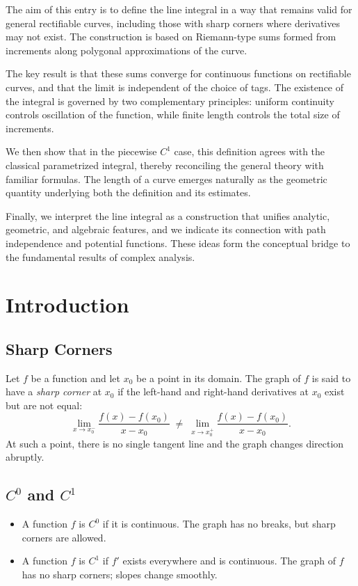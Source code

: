 \documentclass{article}
\begin{document}
The aim of this entry is to define the line integral in a way that remains valid for general rectifiable curves, including
those with sharp corners where derivatives may not exist. The construction is based on Riemann-type sums formed
from increments along polygonal approximations of the curve.

The key result is that these sums converge for continuous functions on rectifiable curves, and that the limit is independent
of the choice of tags. The existence of the integral is governed by two complementary principles: uniform continuity
controls oscillation of the function, while finite length controls the total size of increments.

We then show that in the piecewise \(C^1\) case, this definition agrees with the classical parametrized integral, thereby
reconciling the general theory with familiar formulas. The length of a curve emerges naturally as the geometric quantity
underlying both the definition and its estimates.

Finally, we interpret the line integral as a construction that unifies analytic, geometric, and algebraic features, and we
indicate its connection with path independence and potential functions. These ideas form the conceptual bridge to the
fundamental results of complex analysis.

\section{Introduction}

\subsection{Sharp Corners}
Let $f$ be a function and let $x_0$ be a point in its domain.
The graph of $f$ is said to have a \emph{sharp corner} at $x_0$ if the left-hand
and right-hand derivatives at $x_0$ exist but are not equal:
\[
\lim_{x\to x_0^-}\frac{f(x)-f(x_0)}{x-x_0}
\;\neq\;
\lim_{x\to x_0^+}\frac{f(x)-f(x_0)}{x-x_0}.
\]
At such a point, there is no single tangent line and the graph changes
direction abruptly.

\subsection{$C^0$ and $C^1$}
\begin{itemize}
\item A function $f$ is \emph{$C^0$} if it is continuous.
The graph has no breaks, but sharp corners are allowed.

\item A function $f$ is \emph{$C^1$} if $f'$ exists everywhere and is continuous.
The graph of $f$ has no sharp corners; slopes change smoothly.
\end{itemize}
\end{document}
